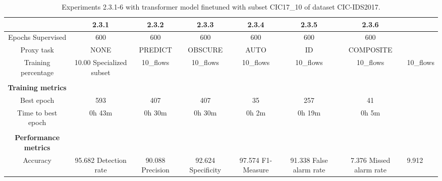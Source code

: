 \begin{table}[htb]
    \centering
    \begin{tabular}{@{}ccccccc@{}}
        \toprule
         & 2.3.1 & 2.3.2 & 2.3.3 & 2.3.4 & 2.3.5 & 2.3.6 \\
        \midrule
        Epochs Supervised &  600 &  600 &  600 &  600 &  600 &  600 \\
        Proxy task &  NONE &  PREDICT &  OBSCURE &  AUTO &  ID &  COMPOSITE \\
        Training percentage &  10.00 %
        Specialized subset &  10_flows &  10_flows &  10_flows &  10_flows &  10_flows &  10_flows \\
         \\
        \textbf{Training metrics} &  &  &  &  &  &  \\
        Best epoch &  593 &  407 &  407 &  35 &  257 &  41 \\
        Time to best epoch &  0h 43m &  0h 30m &  0h 30m &  0h 2m &  0h 19m &  0h 5m \\
         \\
        \textbf{Performance metrics} &  &  &  &  &  &  \\
        Accuracy &  95.682 %
        Detection rate &  90.088 %
        Precision &  92.624 %
        Specificity &  97.574 %
        F1-Measure &  91.338 %
        False alarm rate &  7.376 %
        Missed alarm rate &  9.912 %
        \bottomrule
    \end{tabular}
    \caption{Experiments 2.3.1-6 with transformer model finetuned with subset CIC17\_10 of dataset CIC-IDS2017.}
    \label{table:results:lstm:stats_flows_subset}
\end{table}